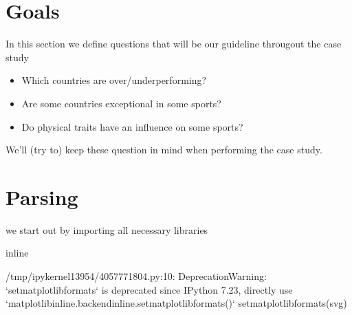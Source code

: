 \documentclass[letterpaper,10pt,english]{jupyterBook}
\begin{document}
\section{Goals}
\label{\detokenize{c7_case_studies/Olympics:goals}}
\sphinxAtStartPar
In this section we define questions that will be our guideline througout the case study
\begin{itemize}
\item {} 
\sphinxAtStartPar
Which countries are over\sphinxhyphen{}/underperforming?

\item {} 
\sphinxAtStartPar
Are some countries exceptional in some sports?

\item {} 
\sphinxAtStartPar
Do physical traits have an influence on some sports?

\end{itemize}

\sphinxAtStartPar
We’ll (try to) keep these question in mind when performing the case study.


\section{Parsing}
\label{\detokenize{c7_case_studies/Olympics:parsing}}
\sphinxAtStartPar
we start out by importing all necessary libraries

\begin{sphinxVerbatim}[commandchars=\\\{\}]
 
 
   
   
   
 
   
   
 inline
\end{sphinxVerbatim}

\begin{sphinxVerbatim}[commandchars=\\\{\}]
/tmp/ipykernel\PYGZus{}13954/4057771804.py:10: DeprecationWarning: `set\PYGZus{}matplotlib\PYGZus{}formats` is deprecated since IPython 7.23, directly use `matplotlib\PYGZus{}inline.backend\PYGZus{}inline.set\PYGZus{}matplotlib\PYGZus{}formats()`
  set\PYGZus{}matplotlib\PYGZus{}formats(\PYGZsq{}svg\PYGZsq{})
\end{sphinxVerbatim}
\end{document}
